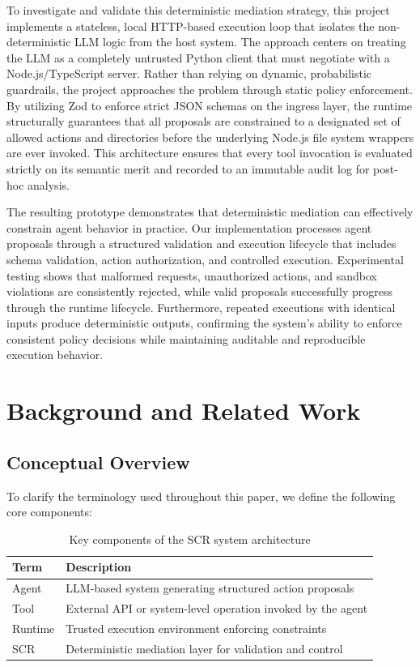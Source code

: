 \documentclass[conference]{IEEEtran}
\begin{document}
To investigate and validate this deterministic mediation strategy, this project implements a stateless, local HTTP-based execution loop that isolates the non-deterministic LLM logic from the host system. The approach centers on treating the LLM as a completely untrusted Python client that must negotiate with a Node.js/TypeScript server. Rather than relying on dynamic, probabilistic guardrails, the project approaches the problem through static policy enforcement. By utilizing Zod to enforce strict JSON schemas on the ingress layer, the runtime structurally guarantees that all proposals are constrained to a designated set of allowed actions and directories before the underlying Node.js file system wrappers are ever invoked. This architecture ensures that every tool invocation is evaluated strictly on its semantic merit and recorded to an immutable audit log for post-hoc analysis.

The resulting prototype demonstrates that deterministic mediation can effectively constrain agent behavior in practice. Our implementation processes agent proposals through a structured validation and execution lifecycle that includes schema validation, action authorization, and controlled execution. Experimental testing shows that malformed requests, unauthorized actions, and sandbox violations are consistently rejected, while valid proposals successfully progress through the runtime lifecycle. Furthermore, repeated executions with identical inputs produce deterministic outputs, confirming the system’s ability to enforce consistent policy decisions while maintaining auditable and reproducible execution behavior.

\section{Background and Related Work}

\subsection{Conceptual Overview}

To clarify the terminology used throughout this paper, we define the following core components:

\begin{table}[h]
\centering
\caption{Key components of the SCR system architecture}
\label{tab:scr_components}
\footnotesize
\begin{tabular}{|p{}|p{}|}
\hline
\textbf{Term} & \textbf{Description} \\ \hline
Agent & LLM-based system generating structured action proposals \\ \hline
Tool & External API or system-level operation invoked by the agent \\ \hline
Runtime & Trusted execution environment enforcing constraints \\ \hline
SCR & Deterministic mediation layer for validation and control \\ \hline
\end{tabular}
\end{table}
\end{document}
